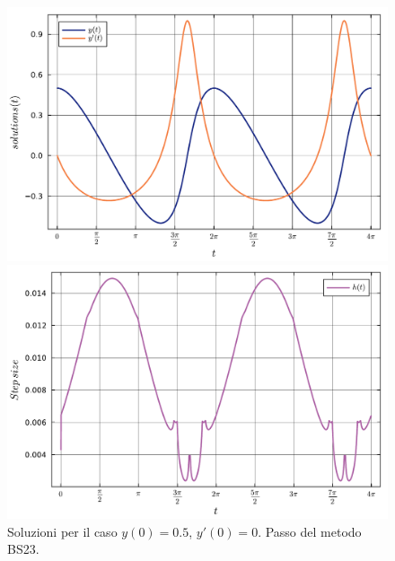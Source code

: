\documentclass[letterpaper, 12pt]{article}
\numberwithin{equation}{section}    %
\begin{document}
\begin{figure}[!ht]
    \centering
    \begin{minipage}[b]{0.47\textwidth}
        \includegraphics[width=\textwidth]{6363.pdf}
    \end{minipage}
    \hspace{0.5cm}
    \begin{minipage}[b]{0.47\textwidth}
        \includegraphics[width=\textwidth]{6364.pdf}
    \end{minipage}
    \caption{Soluzioni per il caso $y(0) = 0.5$, $y'(0) = 0$. Passo del metodo BS23.}
    \label{fig:es6_3_6_2}
\end{figure}
\end{document}

